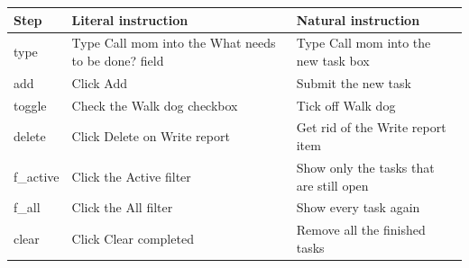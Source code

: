 \begin{tabular}{@{}lp{5.4cm}p{5.6cm}@{}}
\toprule
Step & Literal instruction & Natural instruction \\
\midrule
type & Type \textquotesingle{}Call mom\textquotesingle{} into the What needs to be done? field & Type \textquotesingle{}Call mom\textquotesingle{} into the new task box \\
add & Click Add & Submit the new task \\
toggle & Check the Walk dog checkbox & Tick off \textquotesingle{}Walk dog\textquotesingle{} \\
delete & Click Delete on Write report & Get rid of the \textquotesingle{}Write report\textquotesingle{} item \\
f\_active & Click the Active filter & Show only the tasks that are still open \\
f\_all & Click the All filter & Show every task again \\
clear & Click Clear completed & Remove all the finished tasks \\
\bottomrule
\end{tabular}
